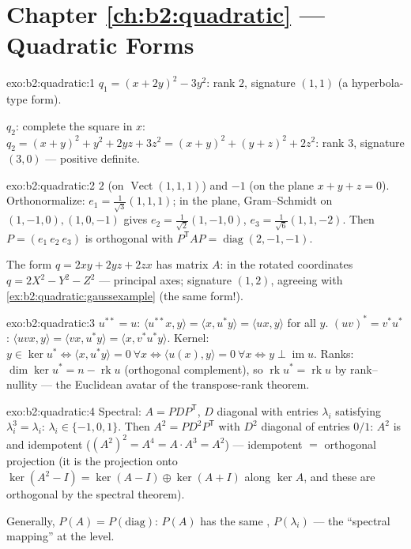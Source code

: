 \section*{Chapter \ref{ch:b2:quadratic} --- Quadratic Forms}

\begin{solution}{exo:b2:quadratic:1}
$q_1 = (x + 2y)^2 - 3y^2$: rank $2$, signature $(1, 1)$ (a
hyperbola-type form).

$q_2$: complete the square in $x$: $q_2 = (x + y)^2 + y^2 + 2yz +
3z^2 = (x+y)^2 + (y + z)^2 + 2z^2$: rank $3$, signature $(3, 0)$
--- positive definite.
\end{solution}

\begin{solution}{exo:b2:quadratic:2}
 $2$ (on $\operatorname{Vect}(1,1,1)$) and $-1$ (on the
plane $x + y + z = 0$). Orthonormalize: $e_1 =
\frac{1}{\sqrt3}(1,1,1)$; in the plane, Gram--Schmidt on $(1,-1,0),
(1,0,-1)$ gives $e_2 = \frac{1}{\sqrt2}(1,-1,0)$, $e_3 =
\frac{1}{\sqrt6}(1,1,-2)$. Then $P = (e_1\ e_2\ e_3)$ is orthogonal
with $P^{\mathsf T}AP = \operatorname{diag}(2,-1,-1)$.

The form $q = 2xy + 2yz + 2zx$ has matrix $A$: in the rotated
coordinates $q = 2X^2 - Y^2 - Z^2$ --- principal axes; signature
$(1,2)$, agreeing with \cref{ex:b2:quadratic:gaussexample}
(the same form!).
\end{solution}

\begin{solution}{exo:b2:quadratic:3}
$u^{**} = u$: $\langle u^{**}x, y\rangle = \langle x, u^*y\rangle =
\langle ux, y\rangle$ for all $y$. $(uv)^* = v^*u^*$: $\langle
uvx, y\rangle = \langle vx, u^*y\rangle = \langle x,
v^*u^*y\rangle$. Kernel: $y \in \ker u^* \iff \langle x, u^*y
\rangle = 0\ \forall x \iff \langle u(x), y\rangle = 0\ \forall x
\iff y \perp \operatorname{im} u$. Ranks: $\dim\ker u^* = n -
\operatorname{rk} u$ (orthogonal complement), so
$\operatorname{rk} u^* = \operatorname{rk} u$ by rank--nullity ---
the Euclidean avatar of the transpose-rank theorem.
\end{solution}

\begin{solution}{exo:b2:quadratic:4}
Spectral: $A = PDP^{\mathsf T}$, $D$ diagonal with entries
$\lambda_i$ satisfying $\lambda_i^3 = \lambda_i$: $\lambda_i \in
\{-1, 0, 1\}$. Then $A^2 = PD^2P^{\mathsf T}$ with $D^2$ diagonal
of entries $0/1$: $A^2$ is  and idempotent
($(A^2)^2 = A^4 = A\cdot A^3 = A^2$) ---  idempotent
$=$ orthogonal projection (it is the projection onto
$\ker(A^2 - I) = \ker(A-I)\oplus\ker(A+I)$ along $\ker A$, and
these are orthogonal by the spectral theorem).

Generally, $P(A) = P\!\left(\text{diag}\right)$: $P(A)$ has the
same ,  $P(\lambda_i)$ --- the ``spectral
mapping'' at the  level.
\end{solution}

